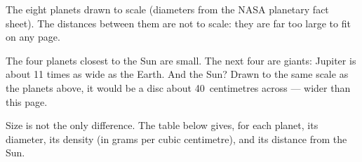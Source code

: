 \begin{omfigure}
\gsixsizes
{}

{\small The eight planets drawn to scale (diameters from the NASA planetary
fact sheet). The distances between them are not to scale: they are far
too large to fit on any page.}
\end{omfigure}

The four planets closest to the Sun are small. The next four are giants:
Jupiter is about 11 times as wide as the Earth. And the Sun? Drawn to the
same scale as the planets above, it would be a disc about 40~centimetres
across --- wider than this page.

Size is not the only difference. The table below gives, for each planet,
its diameter, its density (in grams per cubic centimetre), and its distance
from the Sun.

